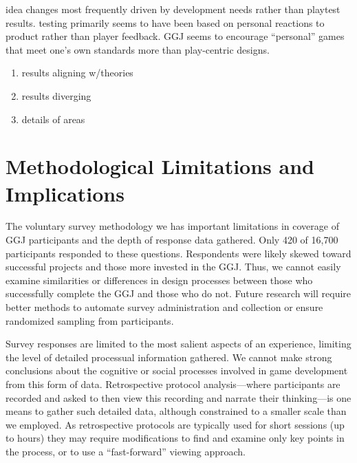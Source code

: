 \documentclass{sig-alternate}
\begin{document}

idea changes most frequently driven by development needs rather than playtest results. testing primarily seems to have been based on personal reactions to product rather than player feedback. GGJ seems to encourage ``personal'' games that meet one's own standards more than play-centric designs. 

\begin{enumerate}
\item results aligning w/theories
\item results diverging
\item details of areas
\end{enumerate}

\section{Methodological Limitations and Implications}
The voluntary survey methodology we has important limitations in coverage of GGJ participants and the depth of response data gathered. Only 420 of 16,700 participants responded to these questions. Respondents were likely skewed toward successful projects and those more invested in the GGJ. Thus, we cannot easily examine similarities or differences in design processes between those who successfully complete the GGJ and those who do not. Future research will require better methods to automate survey administration and collection or ensure randomized sampling from participants.

Survey responses are limited to the most salient aspects of an experience, limiting the level of detailed processual information gathered. We cannot make strong conclusions about the cognitive or social processes involved in game development from this form of data. Retrospective protocol analysis---where participants are recorded and asked to then view this recording and narrate their thinking---is one means to gather such detailed data, although constrained to a smaller scale than we employed. As retrospective protocols are typically used for short sessions (up to hours) they may require modifications to find and examine only key points in the process, or to use a ``fast-forward'' viewing approach. 
\end{document}
